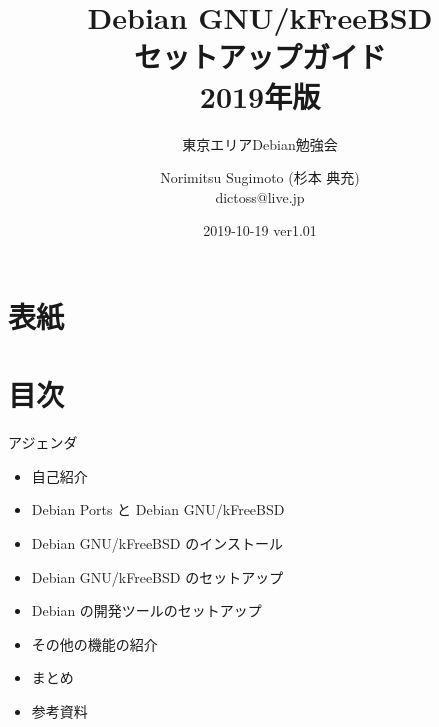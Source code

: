 \title{Debian GNU/kFreeBSD \\ セットアップガイド \\ 2019年版}
\subtitle{東京エリアDebian勉強会} %
\author{Norimitsu Sugimoto (杉本 典充) \\dictoss@live.jp}
\date{2019-10-19 ver1.01}



\section{表紙}

\begin{frame}
  \titlepage{}
\end{frame}


\section{目次}

\begin{frame}{アジェンダ}
  \begin{itemize}
  \item 自己紹介
  \item Debian Ports と Debian GNU/kFreeBSD
  \item Debian GNU/kFreeBSD のインストール
  \item Debian GNU/kFreeBSD のセットアップ
  \item Debian の開発ツールのセットアップ
  \item その他の機能の紹介
  \item まとめ
  \item 参考資料
  \end{itemize}
\end{frame}


